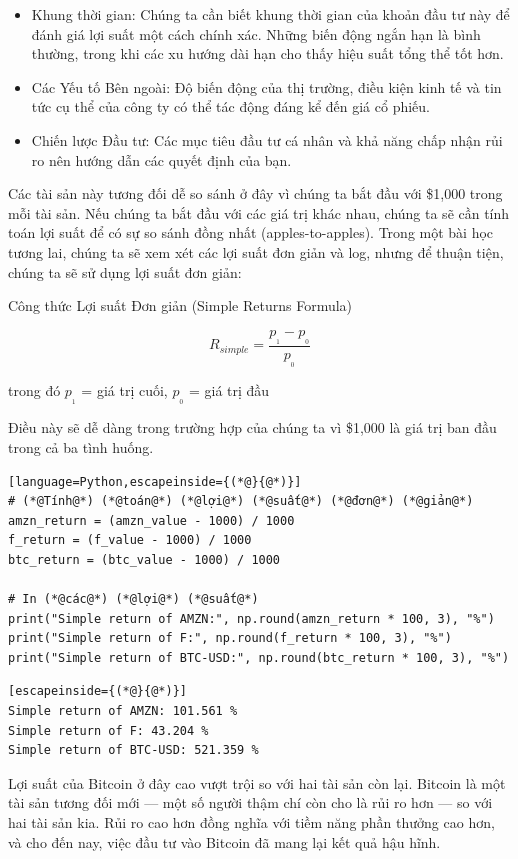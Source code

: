 \begin{itemize}
  \item Khung thời gian: Chúng ta cần biết khung thời gian của khoản đầu tư này để đánh giá lợi suất một cách chính xác. Những biến động ngắn hạn là bình thường, trong khi các xu hướng dài hạn cho thấy hiệu suất tổng thể tốt hơn.
  \item Các Yếu tố Bên ngoài: Độ biến động của thị trường, điều kiện kinh tế và tin tức cụ thể của công ty có thể tác động đáng kể đến giá cổ phiếu.
  \item Chiến lược Đầu tư: Các mục tiêu đầu tư cá nhân và khả năng chấp nhận rủi ro nên hướng dẫn các quyết định của bạn.
\end{itemize}
Các tài sản này tương đối dễ so sánh ở đây vì chúng ta bắt đầu với \$1,000 trong mỗi tài sản. Nếu chúng ta bắt đầu với các giá trị khác nhau, chúng ta sẽ cần tính toán lợi suất để có sự so sánh đồng nhất (apples-to-apples). Trong một bài học tương lai, chúng ta sẽ xem xét các lợi suất đơn giản và log, nhưng để thuận tiện, chúng ta sẽ sử dụng lợi suất đơn giản:

Công thức Lợi suất Đơn giản (Simple Returns Formula)

\[R_{simple} = \frac{p_{_1} - p_{_0}}{p_{_0}}\]

trong đó $p_{_1}$ = giá trị cuối, $p_{_0}$ = giá trị đầu

Điều này sẽ dễ dàng trong trường hợp của chúng ta vì \$1,000 là giá trị ban đầu trong cả ba tình huống.

\begin{lstlisting}[language=Python,escapeinside={(*@}{@*)}]
# (*@Tính@*) (*@toán@*) (*@lợi@*) (*@suất@*) (*@đơn@*) (*@giản@*)
amzn_return = (amzn_value - 1000) / 1000
f_return = (f_value - 1000) / 1000
btc_return = (btc_value - 1000) / 1000

# In (*@các@*) (*@lợi@*) (*@suất@*)
print("Simple return of AMZN:", np.round(amzn_return * 100, 3), "%")
print("Simple return of F:", np.round(f_return * 100, 3), "%")
print("Simple return of BTC-USD:", np.round(btc_return * 100, 3), "%")
\end{lstlisting}

\begin{lstlisting}[escapeinside={(*@}{@*)}]
Simple return of AMZN: 101.561 %
Simple return of F: 43.204 %
Simple return of BTC-USD: 521.359 %
\end{lstlisting}

Lợi suất của Bitcoin ở đây cao vượt trội so với hai tài sản còn lại. Bitcoin là một tài sản tương đối mới --- một số người thậm chí còn cho là rủi ro hơn --- so với hai tài sản kia. Rủi ro cao hơn đồng nghĩa với tiềm năng phần thưởng cao hơn, và cho đến nay, việc đầu tư vào Bitcoin đã mang lại kết quả hậu hĩnh.

